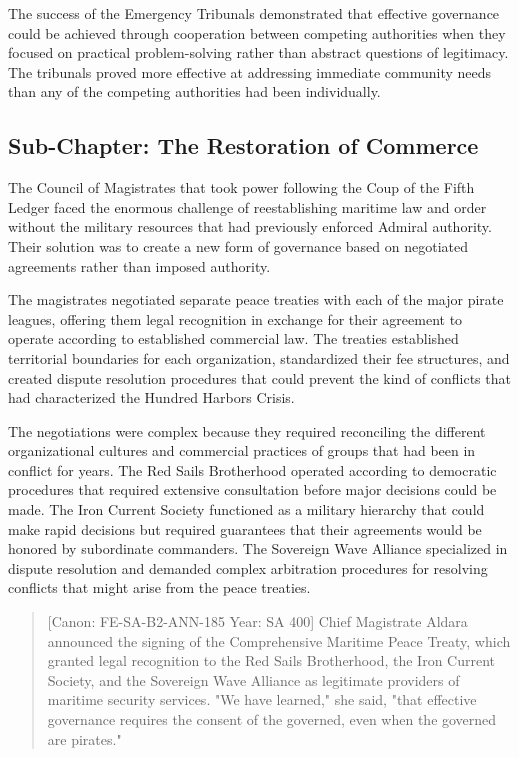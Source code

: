 The success of the Emergency Tribunals demonstrated that effective
governance could be achieved through cooperation between competing
authorities when they focused on practical problem-solving rather than
abstract questions of legitimacy. The tribunals proved more effective at
addressing immediate community needs than any of the competing
authorities had been individually.

\subsection{Sub-Chapter: The Restoration of
Commerce}\label{sub-chapter-the-restoration-of-commerce}

The Council of Magistrates that took power following the Coup of the
Fifth Ledger faced the enormous challenge of reestablishing maritime law
and order without the military resources that had previously enforced
Admiral authority. Their solution was to create a new form of governance
based on negotiated agreements rather than imposed authority.

The magistrates negotiated separate peace treaties with each of the
major pirate leagues, offering them legal recognition in exchange for
their agreement to operate according to established commercial law. The
treaties established territorial boundaries for each organization,
standardized their fee structures, and created dispute resolution
procedures that could prevent the kind of conflicts that had
characterized the Hundred Harbors Crisis.

The negotiations were complex because they required reconciling the
different organizational cultures and commercial practices of groups
that had been in conflict for years. The Red Sails Brotherhood operated
according to democratic procedures that required extensive consultation
before major decisions could be made. The Iron Current Society
functioned as a military hierarchy that could make rapid decisions but
required guarantees that their agreements would be honored by
subordinate commanders. The Sovereign Wave Alliance specialized in
dispute resolution and demanded complex arbitration procedures for
resolving conflicts that might arise from the peace treaties.

\begin{quote}
{[}Canon: FE-SA-B2-ANN-185 \textbar{} Year: SA 400{]} Chief Magistrate
Aldara announced the signing of the Comprehensive Maritime Peace Treaty,
which granted legal recognition to the Red Sails Brotherhood, the Iron
Current Society, and the Sovereign Wave Alliance as legitimate providers
of maritime security services. "We have learned," she said, "that
effective governance requires the consent of the governed, even when the
governed are pirates."
\end{quote}

